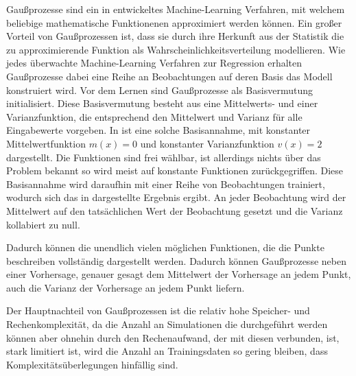 Gaußprozesse sind ein in \cite{Rasmussen.2008} entwickeltes Machine-Learning Verfahren, mit welchem beliebige mathematische Funktionenen approximiert werden können.
Ein großer Vorteil von Gaußprozessen ist, dass sie durch ihre Herkunft aus der Statistik die zu approximierende Funktion als Wahrscheinlichkeitsverteilung modellieren.
Wie jedes überwachte Machine-Learning Verfahren zur Regression erhalten Gaußprozesse dabei eine Reihe an Beobachtungen auf deren Basis das Modell konstruiert wird.
Vor dem Lernen sind Gaußprozesse als Basisvermutung initialisiert.
Diese Basisvermutung besteht aus eine Mittelwerts- und einer Varianzfunktion, die entsprechend den Mittelwert und Varianz für alle Eingabewerte vorgeben.
In \todo{} ist eine solche Basisannahme, mit konstanter Mittelwertfunktion $m(x)=0$ und konstanter Varianzfunktion $v(x)=2$ dargestellt.
Die Funktionen sind frei wählbar, ist allerdings nichts über das Problem bekannt so wird meist auf konstante Funktionen zurückgegriffen.
Diese Basisannahme wird daraufhin mit einer Reihe von Beobachtungen trainiert, wodurch sich das in \todo{} dargestellte Ergebnis ergibt.
An jeder Beobachtung wird der Mittelwert auf den tatsächlichen Wert der Beobachtung gesetzt und die Varianz kollabiert zu null.


Dadurch können die unendlich vielen möglichen Funktionen, die die Punkte beschreiben vollständig dargestellt werden.
Dadurch können Gaußprozesse neben einer Vorhersage, genauer gesagt dem Mittelwert der Vorhersage an jedem Punkt, auch die Varianz der Vorhersage an jedem Punkt liefern.
%



Der Hauptnachteil von Gaußprozessen ist die relativ hohe Speicher- und Rechenkomplexität, da die Anzahl an Simulationen die durchgeführt werden können aber ohnehin durch den Rechenaufwand, der mit diesen verbunden, ist, stark limitiert ist, wird die Anzahl an Trainingsdaten so gering bleiben, dass Komplexitätsüberlegungen hinfällig sind.

